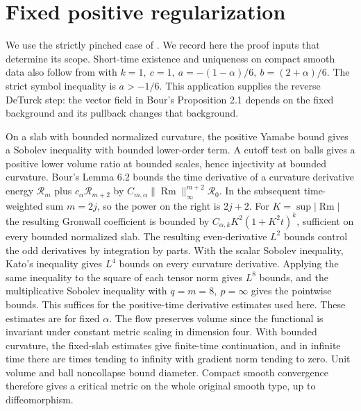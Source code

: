 \documentclass[11pt,letterpaper]{article}
\DeclareMathOperator{\Rm}{Rm}
\begin{document}
\section{Fixed positive regularization}
We use the strictly pinched case of
\cite[Theorems 1.4, 1.9, 1.11 and \S8]{Bour2010FourthOrderCurvatureFlows}.
We record here the proof inputs that determine its scope.
Short-time existence and uniqueness on compact smooth data also follow
from \cite[Theorem A, equation (4)]{BahuaudHelliwell2015Uniqueness}
with \(k=1,\ c=1,\ a=-(1-\alpha)/6,\ b=(2+\alpha)/6\).
The strict symbol inequality is \(a>-1/6\). This application supplies
the reverse DeTurck step: the vector field in Bour's Proposition 2.1
depends on the fixed background and its pullback changes that background.

On a slab with bounded normalized curvature, the positive Yamabe bound
gives a Sobolev inequality with bounded lower-order term. A cutoff test
on balls gives a positive lower volume ratio at bounded scales, hence
injectivity at bounded curvature. Bour's Lemma 6.2 bounds the time
derivative of a curvature derivative energy \(\mathcal R_m\) plus
\(c_\alpha\mathcal R_{m+2}\) by
\(C_{m,\alpha}\|\Rm\|_\infty^{m+2}\mathcal R_0\).
In the subsequent time-weighted sum \(m=2j\), so the power on the right
is \(2j+2\). For \(K=\sup|\Rm|\) the resulting Gronwall coefficient
is bounded by \(C_{\alpha,k}K^2(1+K^2t)^k\), sufficient on
every bounded normalized slab. The resulting even-derivative
\(L^2\) bounds control the odd derivatives by integration by parts.
With the scalar Sobolev inequality, Kato's inequality gives \(L^4\)
bounds on every curvature derivative. Applying the same inequality
to the square of each tensor norm gives \(L^8\) bounds, and the
multiplicative Sobolev inequality \cite[Proposition 9.16]{Bour2010FourthOrderCurvatureFlows}
with \(q=m=8,\ p=\infty\) gives the pointwise bounds. This suffices for the positive-time
derivative estimates used here. These estimates are for fixed \(\alpha\).
The flow preserves volume since the functional is invariant under
constant metric scaling in dimension four. With bounded curvature,
the fixed-slab estimates give finite-time continuation, and in infinite
time there are times tending to infinity with gradient norm tending
to zero. Unit volume and ball noncollapse bound diameter. Compact
smooth convergence therefore gives a critical metric on the whole
original smooth type, up to diffeomorphism.
\end{document}

